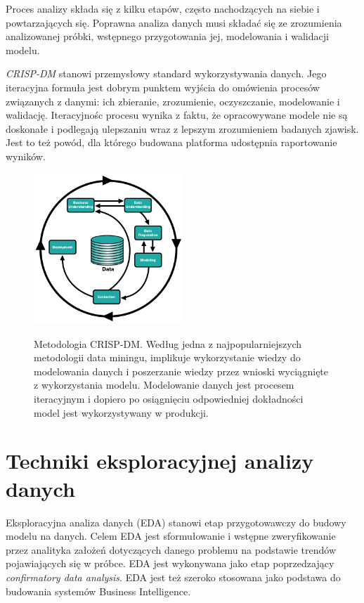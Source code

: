 \documentclass[12pt,a4paper,oneside]{report} %
\begin{document}
Proces analizy składa się z kilku etapów, często nachodzących na siebie i powtarzających się. Poprawna analiza danych musi składać się ze zrozumienia analizowanej próbki, wstępnego przygotowania jej, modelowania i walidacji modelu. \par

\emph{CRISP-DM} stanowi przemysłowy standard wykorzystywania danych. Jego iteracyjna formuła jest dobrym punktem wyjścia do omówienia procesów związanych z danymi: ich zbieranie, zrozumienie, oczyszczanie, modelowanie i walidację. Iteracyjnośc procesu wynika z faktu, że opracowywane modele nie są doskonałe i podlegają ulepszaniu wraz z lepszym zrozumieniem badanych zjawisk. Jest to też powód, dla którego budowana platforma udostępnia raportowanie wyników. \cite{crispdm} \par

\begin{figure}
\centering
\includegraphics[width=0.5\textwidth]{crisp-dm.png}
\label{crispdm}
\caption[Metodologia CRISP-DM]{Metodologia CRISP-DM. Według \cite{crispdm} jedna z najpopularniejszych metodologii data miningu, implikuje wykorzystanie wiedzy do modelowania danych i poszerzanie wiedzy przez wnioski wyciągnięte z wykorzystania modelu. Modelowanie danych jest procesem iteracyjnym i dopiero po osiągnięciu odpowiedniej dokładności model jest wykorzystywany w produkcji.}
\end{figure}





\section{Techniki eksploracyjnej analizy danych}

Eksploracyjna analiza danych (EDA) stanowi etap przygotowawczy do budowy modelu na danych. Celem EDA jest sformułowanie i wstępne zweryfikowanie przez analityka założeń dotyczących danego problemu na podstawie trendów pojawiających się w próbce. EDA jest wykonywana jako etap poprzedzający \emph{confirmatory data analysis}. EDA jest też szeroko stosowana jako podstawa do budowania systemów Business Intelligence.\cite{hseltman} \par 
\end{document}
